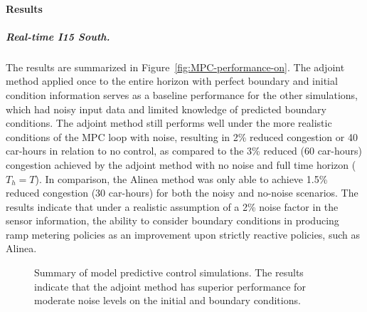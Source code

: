\paragraph{Results}
								
\subparagraph{Real-time I15 South.}
								
The results are summarized in Figure~\ref{fig:MPC-performance-on}.
The adjoint method applied once to the entire horizon with perfect
boundary and initial condition information serves as a baseline performance
for the other simulations, which had noisy input data and limited
knowledge of predicted boundary conditions. The adjoint method still
performs well under the more realistic conditions of the MPC loop
with noise, resulting in 2\% reduced congestion or 40 car-hours in relation to no control, as compared to the 3\% reduced (60 car-hours) congestion achieved by the adjoint method with no noise and full time horizon ($T_h=T$). In comparison, the Alinea method was only able to achieve 1.5\% reduced congestion (30 car-hours) for both the noisy and no-noise scenarios. The results indicate
that under a realistic assumption of a 2\% noise factor in the sensor
information, the ability to consider boundary conditions in producing
ramp metering policies as an improvement upon strictly reactive policies,
such as Alinea.
								
\begin{figure}
	\hfill{}
	\caption{Summary of model predictive control simulations. The results indicate that the adjoint method has superior performance for moderate noise levels on the initial and boundary conditions.}
\end{figure}
								
